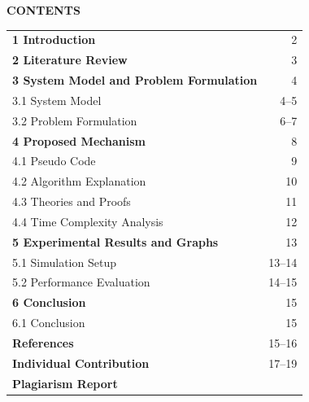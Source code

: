 \documentclass[12pt,a4paper]{report}
\begin{document}
\begin{center}
  {\Large\bfseries CONTENTS}
\end{center}

\vspace{1em}

\noindent
\begin{tabular*}{\textwidth}{@{}p{}@{\extracolsep{\fill}}r@{}}
\textbf{1 Introduction} & 2 \\[0.6em]
\textbf{2 Literature Review} & 3 \\[0.6em]
\textbf{3 System Model and Problem Formulation} & 4 \\[0.35em]
\hspace{1.5em} 3.1 System Model & 4--5 \\[0.35em]
\hspace{1.5em} 3.2 Problem Formulation & 6--7 \\[0.6em]
\textbf{4 Proposed Mechanism} & 8 \\[0.35em]
\hspace{1.5em} 4.1 Pseudo Code & 9 \\[0.35em]
\hspace{1.5em} 4.2 Algorithm Explanation & 10 \\[0.35em]
\hspace{1.5em} 4.3 Theories and Proofs & 11 \\[0.35em]
\hspace{1.5em} 4.4 Time Complexity Analysis & 12 \\[0.6em]
\textbf{5 Experimental Results and Graphs} & 13 \\[0.35em]
\hspace{1.5em} 5.1 Simulation Setup & 13--14 \\[0.35em]
\hspace{1.5em} 5.2 Performance Evaluation & 14--15 \\[0.6em]
\textbf{6 Conclusion} & 15 \\[0.35em]
\hspace{1.5em} 6.1 Conclusion & 15 \\[0.6em]
\textbf{References} & 15--16 \\[0.6em]
\textbf{Individual Contribution} & 17--19 \\[0.6em]
\textbf{Plagiarism Report} & \\
\end{tabular*}

\clearpage

\end{document}
